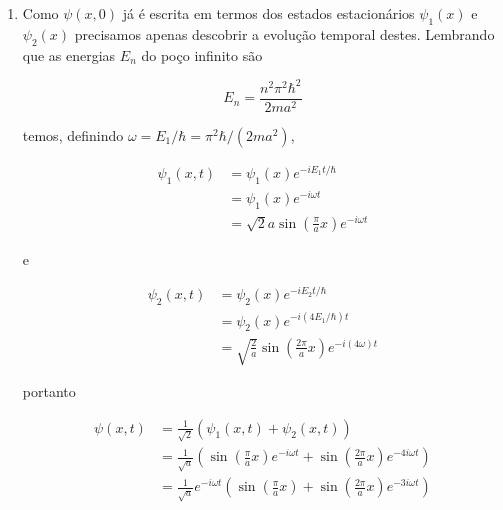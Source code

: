 \documentclass[a4paper, 12pt, notitlepage]{article}
\begin{document}
\begin{enumerate}
\begin{enumerate}
  \item Como $\psi(x,0)$ já é escrita em termos dos estados estacionários $\psi_1(x)$ e $\psi_2(x)$ precisamos apenas descobrir a evolução temporal destes. Lembrando que as energias $E_n$ do poço infinito são
  
  \begin{equation*}
  E_n = \frac{n^2 \pi^2 \hbar^2}{2ma^2}
  \end{equation*}
  
  temos, definindo $\omega = E_1/\hbar = \pi^2 \hbar/(2ma^2)$,
  
  \begin{align*}
  \psi_1(x,t) &= \psi_1(x) e^{-iE_1t/\hbar} \\
  &= \psi_1(x) e^{-i\omega t} \\
  &= \sqrt{2}{a} \sin\left(\frac{\pi}{a}x\right) e^{-i\omega t}
  \end{align*}
  
  e
  
  \begin{align*}
  \psi_2(x,t) &= \psi_2(x) e^{-iE_2t/\hbar} \\
  &= \psi_2(x) e^{-i(4E_1/\hbar) t} \\
  &= \sqrt{\frac{2}{a}} \sin\left(\frac{2\pi}{a}x\right) e^{-i(4\omega)t}
  \end{align*}
  
  portanto
  
  \begin{align*}
  \psi(x,t) &= \frac{1}{\sqrt{2}} \left(\psi_1(x,t) + \psi_2(x,t)\right) \\
  &= \frac{1}{\sqrt{a}}\left(\sin\left(\frac{\pi}{a}x\right)e^{-i\omega t} + \sin\left(\frac{2\pi}{a}x\right)e^{-4i\omega t}\right) \\
  &= \frac{1}{\sqrt{a}} e^{-i\omega t} \left(\sin\left(\frac{\pi}{a}x\right) + \sin\left(\frac{2\pi}{a}x\right)e^{-3i\omega t}\right)
  \end{align*}  
  
  

\end{enumerate}
\end{enumerate}
\end{document}

